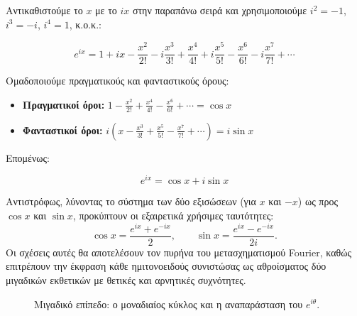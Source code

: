 Αντικαθιστούμε το \(x\) με το \(ix\) στην παραπάνω σειρά και
χρησιμοποιούμε \(i^2 = -1\), \(i^3 = -i\), \(i^4 = 1\), κ.ο.κ.:

\[
e^{ix} = 1 + ix - \frac{x^2}{2!} - i\frac{x^3}{3!} + \frac{x^4}{4!} + i\frac{x^5}{5!} - \frac{x^6}{6!} - i\frac{x^7}{7!} + \cdots
\]

Ομαδοποιούμε πραγματικούς και φανταστικούς όρους:

\begin{itemize}
\tightlist
\item
  \textbf{Πραγματικοί όροι:}
  \(1 - \frac{x^2}{2!} + \frac{x^4}{4!} - \frac{x^6}{6!} + \cdots = \cos x\)
\item
  \textbf{Φανταστικοί όροι:}
  \(i\left(x - \frac{x^3}{3!} + \frac{x^5}{5!} - \frac{x^7}{7!} + \cdots\right) = i\sin x\)
\end{itemize}

Επομένως:

\[
\boxed{e^{ix} = \cos x + i\sin x}
\]

Αντιστρόφως, λύνοντας το σύστημα των δύο εξισώσεων (για \(x\) και
\(-x\)) ως προς \(\cos x\) και \(\sin x\), προκύπτουν οι εξαιρετικά
χρήσιμες ταυτότητες: \[
\cos x = \frac{e^{ix} + e^{-ix}}{2}, \qquad 
\sin x = \frac{e^{ix} - e^{-ix}}{2i}.
\] Οι σχέσεις αυτές θα αποτελέσουν τον πυρήνα του μετασχηματισμού
Fourier, καθώς επιτρέπουν την έκφραση κάθε ημιτονοειδούς συνιστώσας ως
αθροίσματος δύο μιγαδικών εκθετικών με θετικές και αρνητικές συχνότητες.

\begin{figure}[htbp]
\centering
{}
\caption{Μιγαδικό επίπεδο: ο μοναδιαίος κύκλος και η αναπαράσταση του $e^{i\theta}$.}
\label{fig:euler}
\end{figure}


